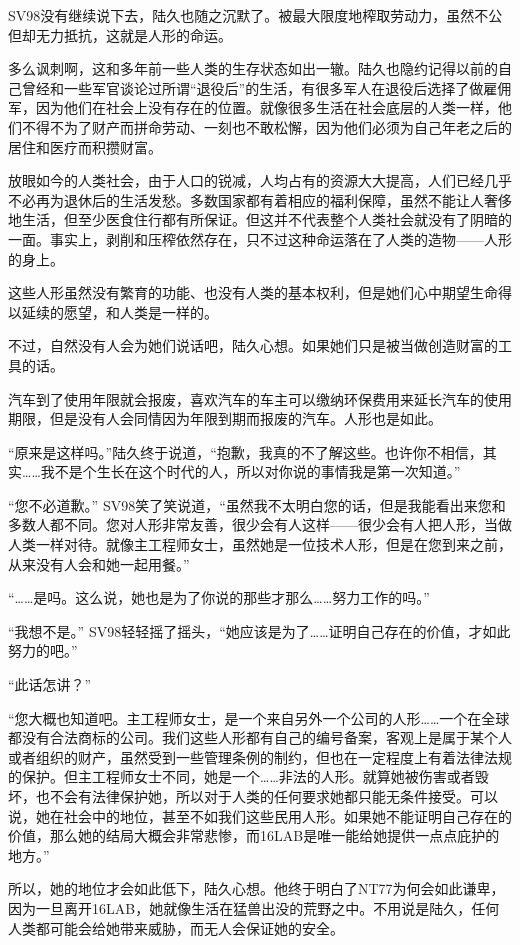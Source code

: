 SV98没有继续说下去，陆久也随之沉默了。被最大限度地榨取劳动力，虽然不公但却无力抵抗，这就是人形的命运。

多么讽刺啊，这和多年前一些人类的生存状态如出一辙。陆久也隐约记得以前的自己曾经和一些军官谈论过所谓“退役后”的生活，有很多军人在退役后选择了做雇佣军，因为他们在社会上没有存在的位置。就像很多生活在社会底层的人类一样，他们不得不为了财产而拼命劳动、一刻也不敢松懈，因为他们必须为自己年老之后的居住和医疗而积攒财富。

放眼如今的人类社会，由于人口的锐减，人均占有的资源大大提高，人们已经几乎不必再为退休后的生活发愁。多数国家都有着相应的福利保障，虽然不能让人奢侈地生活，但至少医食住行都有所保证。但这并不代表整个人类社会就没有了阴暗的一面。事实上，剥削和压榨依然存在，只不过这种命运落在了人类的造物——人形的身上。

这些人形虽然没有繁育的功能、也没有人类的基本权利，但是她们心中期望生命得以延续的愿望，和人类是一样的。

不过，自然没有人会为她们说话吧，陆久心想。如果她们只是被当做创造财富的工具的话。

汽车到了使用年限就会报废，喜欢汽车的车主可以缴纳环保费用来延长汽车的使用期限，但是没有人会同情因为年限到期而报废的汽车。人形也是如此。

“原来是这样吗。”陆久终于说道，“抱歉，我真的不了解这些。也许你不相信，其实……我不是个生长在这个时代的人，所以对你说的事情我是第一次知道。”

“您不必道歉。” SV98笑了笑说道，“虽然我不太明白您的话，但是我能看出来您和多数人都不同。您对人形非常友善，很少会有人这样——很少会有人把人形，当做人类一样对待。就像主工程师女士，虽然她是一位技术人形，但是在您到来之前，从来没有人会和她一起用餐。”

“……是吗。这么说，她也是为了你说的那些才那么……努力工作的吗。”

“我想不是。” SV98轻轻摇了摇头，“她应该是为了……证明自己存在的价值，才如此努力的吧。”

“此话怎讲？”

“您大概也知道吧。主工程师女士，是一个来自另外一个公司的人形……一个在全球都没有合法商标的公司。我们这些人形都有自己的编号备案，客观上是属于某个人或者组织的财产，虽然受到一些管理条例的制约，但也在一定程度上有着法律法规的保护。但主工程师女士不同，她是一个……非法的人形。就算她被伤害或者毁坏，也不会有法律保护她，所以对于人类的任何要求她都只能无条件接受。可以说，她在社会中的地位，甚至不如我们这些民用人形。如果她不能证明自己存在的价值，那么她的结局大概会非常悲惨，而16LAB是唯一能给她提供一点点庇护的地方。”

所以，她的地位才会如此低下，陆久心想。他终于明白了NT77为何会如此谦卑，因为一旦离开16LAB，她就像生活在猛兽出没的荒野之中。不用说是陆久，任何人类都可能会给她带来威胁，而无人会保证她的安全。

